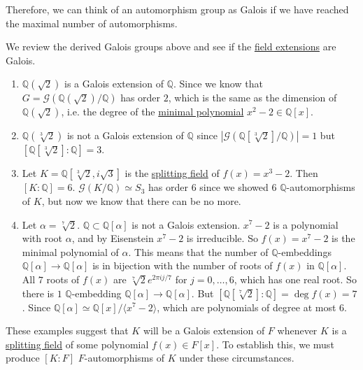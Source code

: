   Therefore, we can think of an automorphism group as Galois if we have reached the maximal number of automorphisms. 

  \begin{example}
    \label{ex:simple-examples}
    We review the derived Galois groups above and see if the \hyperref[def:field-extension]{field extensions} are Galois. 
    \begin{enumerate}
      \item $\mathbb{Q}(\sqrt{2})$ is a Galois extension of $\mathbb{Q}$. Since we know that $G = \mathcal{G}(\mathbb{Q}(\sqrt{2})/\mathbb{Q})$ has order $2$, which is the same as the dimension of $\mathbb{Q}(\sqrt{2})$, i.e. the degree of the \hyperref[def:min_poly]{minimal polynomial} $x^2 - 2 \in \mathbb{Q}[x]$. 

      \item $\mathbb{Q}(\sqrt[3]{2})$ is not a Galois extension of $\mathbb{Q}$ since $|\mathcal{G}(\mathbb{Q}[\sqrt[3]{2}]/\mathbb{Q})| = 1$ but $[\mathbb{Q}[\sqrt[3]{2}] : \mathbb{Q}] = 3$. 

      \item Let $K = \mathbb{Q}[\sqrt[3]{2}, i \sqrt{3}]$ is the \hyperref[def:splitting-field]{splitting field} of $f(x) = x^3 - 2$. Then $[K:\mathbb{Q}] = 6$. $\mathcal{G}(K/\mathbb{Q}) \simeq S_3$ has order $6$ since we showed 6 $\mathbb{Q}$-automorphisms of $K$, but now we know that there can be no more. 

      \item Let $\alpha = \sqrt[7]{2}$. $\mathbb{Q} \subset \mathbb{Q}[\alpha]$ is not a Galois extension. $x^7 - 2$ is a polynomial with root $\alpha$, and by Eisenstein $x^7 - 2$ is irreducible. So $f(x) = x^7 - 2$ is the minimal polynomial of $\alpha$. This means that the number of $\mathbb{Q}$-embeddings $\mathbb{Q}[\alpha] \to \mathbb{Q}[\alpha]$ is in bijection with the number of roots of $f(x)$ in $\mathbb{Q}[\alpha]$. All $7$ roots of $f(x)$ are $\sqrt[7]{2} e^{2\pi i j/7}$ for $j = 0, \ldots, 6$, which has one real root. So there is $1$ $\mathbb{Q}$-embedding $\mathbb{Q}[\alpha] \to \mathbb{Q}[\alpha]$. But $[\mathbb{Q}[\sqrt[7]{2}] : \mathbb{Q}] = \deg{f(x)} = 7$. Since $\mathbb{Q}[\alpha] \simeq \mathbb{Q}[x]/{\langle x^7 - 2 \rangle}$, which are polynomials of degree at most $6$. 
    \end{enumerate}
  \end{example}

  These examples suggest that $K$ will be a Galois extension of $F$ whenever $K$ is a \hyperref[def:splitting-field]{splitting field} of some polynomial $f(x) \in F[x]$. To establish this, we must produce $[K:F]$ $F$-automorphisms of $K$ under these circumstances. 

